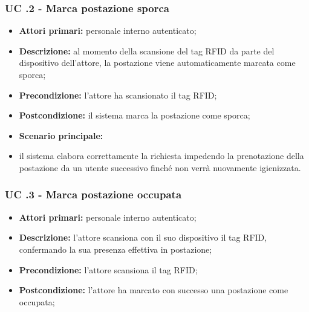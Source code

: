 \subsubsection{UC .2 - Marca postazione sporca}

\begin{itemize}
\item \textbf{Attori primari:} personale interno autenticato;
\item \textbf{Descrizione:} al momento della scansione del tag RFID da parte del dispositivo dell'attore, la postazione viene automaticamente marcata come sporca;
\item \textbf{Precondizione:} l'attore ha scansionato il tag RFID; 
\item \textbf{Postcondizione:} il sistema marca la postazione come sporca;
\item \textbf{Scenario principale:} 
		\item il sistema elabora correttamente la richiesta impedendo la prenotazione della postazione da un utente successivo finché non verrà nuovamente igienizzata.
\end{itemize}


\newpage

\subsubsection{UC .3 - Marca postazione occupata}

\begin{itemize}
\item \textbf{Attori primari:} personale interno autenticato;
\item \textbf{Descrizione:} l'attore scansiona con il suo dispositivo il tag RFID, confermando la sua presenza effettiva in postazione;
\item \textbf{Precondizione:} l'attore scansiona il tag RFID;
\item \textbf{Postcondizione:} l'attore ha marcato con successo una postazione come occupata;
\end{itemize}


